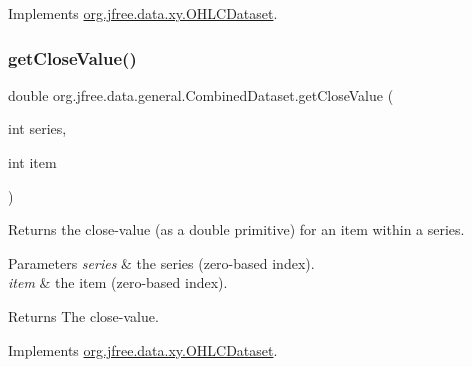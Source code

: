 Implements \mbox{\hyperlink{interfaceorg_1_1jfree_1_1data_1_1xy_1_1_o_h_l_c_dataset_a7c84699d1c3f6d5b4d1378d7b23d49ac}{org.\+jfree.\+data.\+xy.\+O\+H\+L\+C\+Dataset}}.

\mbox{\label{classorg_1_1jfree_1_1data_1_1general_1_1_combined_dataset_ad1bc2a134c68b370da40608ce58a6b36}} 
\subsubsection{\texorpdfstring{get\+Close\+Value()}{getCloseValue()}}
{\footnotesize\ttfamily double org.\+jfree.\+data.\+general.\+Combined\+Dataset.\+get\+Close\+Value (\begin{DoxyParamCaption}\item[{int}]{series,  }\item[{int}]{item }\end{DoxyParamCaption})}

Returns the close-\/value (as a double primitive) for an item within a series.


\begin{DoxyParams}{Parameters}
{\em series} & the series (zero-\/based index). \\
\hline
{\em item} & the item (zero-\/based index).\\
\hline
\end{DoxyParams}
\begin{DoxyReturn}{Returns}
The close-\/value. 
\end{DoxyReturn}


Implements \mbox{\hyperlink{interfaceorg_1_1jfree_1_1data_1_1xy_1_1_o_h_l_c_dataset_a5533f5d89de4aec9d67cfdc9289a1099}{org.\+jfree.\+data.\+xy.\+O\+H\+L\+C\+Dataset}}.

\mbox{\label{classorg_1_1jfree_1_1data_1_1general_1_1_combined_dataset_a28df4ee7d3f9678e84d3404305c13cb9}} 
